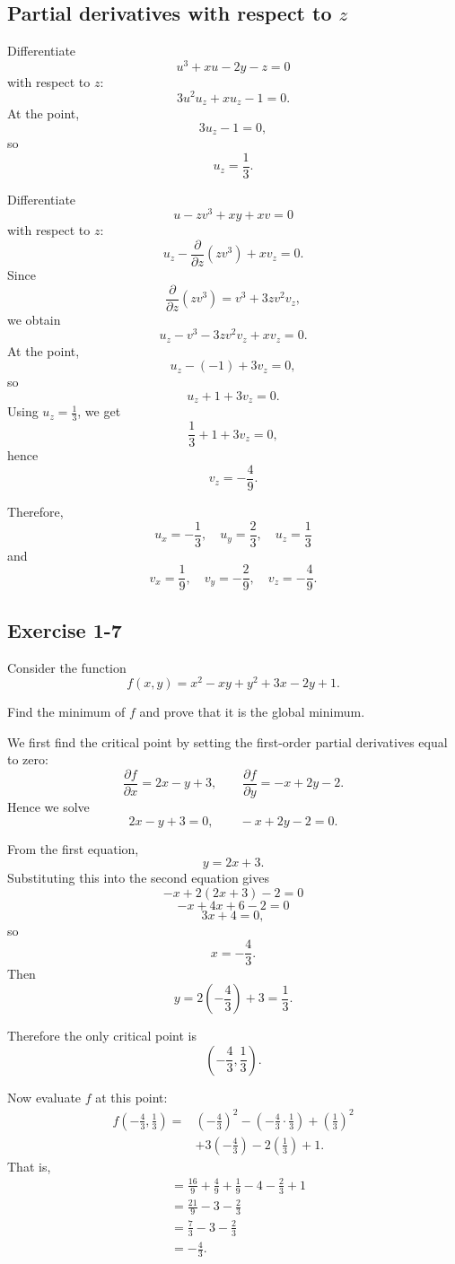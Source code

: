 \subsection*{Partial derivatives with respect to \(z\)}

Differentiate
\[
u^3+xu-2y-z=0
\]
with respect to \(z\):
\[
3u^2u_z+xu_z-1=0.
\]
At the point,
\[
3u_z-1=0,
\]
so
\[
u_z=\frac13.
\]

Differentiate
\[
u-zv^3+xy+xv=0
\]
with respect to \(z\):
\[
u_z-\frac{\partial}{\partial z}(zv^3)+xv_z=0.
\]
Since
\[
\frac{\partial}{\partial z}(zv^3)=v^3+3zv^2v_z,
\]
we obtain
\[
u_z-v^3-3zv^2v_z+xv_z=0.
\]
At the point,
\[
u_z-(-1)+3v_z=0,
\]
so
\[
u_z+1+3v_z=0.
\]
Using \(u_z=\frac13\), we get
\[
\frac13+1+3v_z=0,
\]
hence
\[
v_z=-\frac49.
\]

Therefore,
\[
\boxed{
u_x=-\frac13,\quad u_y=\frac23,\quad u_z=\frac13
}
\]
and
\[
\boxed{
v_x=\frac19,\quad v_y=-\frac29,\quad v_z=-\frac49.
}
\]





\vspace{30pt}
\begin{tcolorbox}[breakable]

\subsection*{Exercise 1-7}

Consider the function
\[
f(x,y) = x^2 - xy + y^2 + 3x - 2y + 1.
\]

Find the minimum of $f$ and prove that it is the global minimum.

\end{tcolorbox}



We first find the critical point by setting the first-order partial derivatives equal to zero:
\[
\frac{\partial f}{\partial x}=2x-y+3,
\qquad
\frac{\partial f}{\partial y}=-x+2y-2.
\]
Hence we solve
\[
2x-y+3=0,
\qquad
-x+2y-2=0.
\]

From the first equation,
\[
y=2x+3.
\]
Substituting this into the second equation gives
\[
-x+2(2x+3)-2=0
\]
\[
-x+4x+6-2=0
\]
\[
3x+4=0,
\]
so
\[
x=-\frac{4}{3}.
\]
Then
\[
y=2\left(-\frac{4}{3}\right)+3=\frac{1}{3}.
\]

Therefore the only critical point is
\[
\left(-\frac{4}{3},\frac{1}{3}\right).
\]

Now evaluate \(f\) at this point:
\[
\begin{aligned}
f\left(-\frac{4}{3},\frac{1}{3}\right)
=
&\left(-\frac{4}{3}\right)^2
-\left(-\frac{4}{3}\cdot\frac{1}{3}\right)
+\left(\frac{1}{3}\right)^2\\
&+3\left(-\frac{4}{3}\right)
-2\left(\frac{1}{3}\right)+1.
\end{aligned}
\]
That is,
\[
\begin{aligned}
&=
\frac{16}{9}+\frac{4}{9}+\frac{1}{9}-4-\frac{2}{3}+1\\
&=
\frac{21}{9}-3-\frac{2}{3}\\
&=
\frac{7}{3}-3-\frac{2}{3}\\
&=
-\frac{4}{3}.
\end{aligned}
\]

